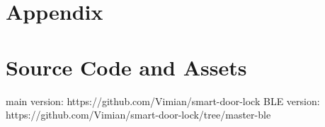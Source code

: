 \section*{Appendix}
\appendix

\section{Source Code and Assets}
main version: https://github.com/Vimian/smart-door-lock
\newline
BLE version: https://github.com/Vimian/smart-door-lock/tree/master-ble

